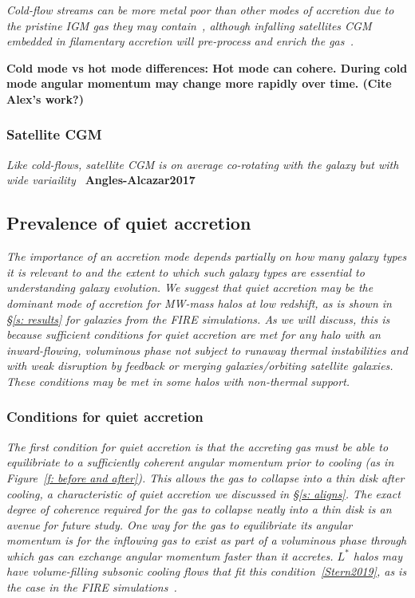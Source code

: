 \documentclass[fleqn,usenatbib]{mnras}
\begin{document}
\textit{
Cold-flow streams can be more metal poor than other modes of accretion due to the pristine IGM gas they may contain~\citep[e.g.][]{Wright2021}, although infalling satellites CGM embedded in filamentary accretion will pre-process and enrich the gas~\citep[e.g.][]{Hafen2019}.
}

\textbf{Cold mode vs hot mode differences:
Hot mode can cohere.
During cold mode angular momentum may change more rapidly over time. (Cite Alex's work?)}

\subsubsection{Satellite CGM}

\textit{
Like cold-flows, satellite CGM is on average co-rotating with the galaxy but with wide variaility~\citep[e.g.][]{Stewart2011, Hafen2019}
}
\textbf{Angles-Alcazar2017}

\subsection{Prevalence of quiet accretion}
\label{s: prevalence}

\textit{
The importance of  an accretion mode depends partially on how many galaxy types it is relevant to and the extent to which such galaxy types are essential to understanding galaxy evolution.
We suggest that quiet accretion may be the dominant mode of accretion for MW-mass halos at low redshift, as is shown in \S\ref{s: results} for galaxies from the FIRE simulations.
As we will discuss, this is because sufficient conditions for quiet accretion are met for any halo with an inward-flowing, voluminous phase not subject to runaway thermal instabilities and with weak disruption by feedback or merging galaxies/orbiting satellite galaxies.
These conditions may be met in some halos with non-thermal support.
}

\subsubsection{Conditions for quiet accretion}
\label{s: prevalence -- conditions}

\textit{
The first condition for quiet accretion is that the accreting gas must be able to equilibriate to a sufficiently coherent angular momentum prior to cooling (as in Figure~\ref{f: before and after}).
This allows the gas to collapse into a thin disk after cooling, a characteristic of quiet accretion we discussed in \S\ref{s: aligns}.
The exact degree of coherence required for the gas to collapse neatly into a thin disk is an avenue for future study.
One way for the gas to equilibriate its angular momentum is for the inflowing gas to exist as part of a voluminous phase through which gas can exchange angular momentum faster than it accretes.
$L^*$ halos may have volume-filling subsonic cooling flows that fit this condition~\ref{Stern2019}, as is the case in the FIRE simulations~\citep{Stern2020a}.
}
\end{document}
